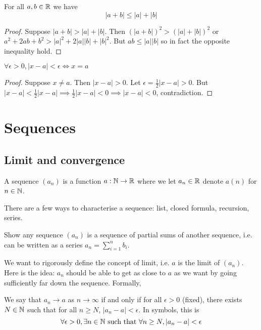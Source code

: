 \documentclass[11pt]{article}
\begin{document}
\begin{theorem}
  For all \(a,b \in\mathbb{R}\) we have \[|a+b|\leq |a|+|b|\]
\end{theorem}
\begin{proof}
  Suppose \(|a+b|>|a|+|b|\). Then \((|a+b|)^2>(|a|+|b|)^2\) or \(a^2+2ab+b^2>|a|^2+2|a||b|+|b|^2\). But \(ab\leq |a||b|\) so in fact the opposite inequality hold. 
\end{proof}

\begin{proposition}
  \(\forall \epsilon >0, |x-a|<\epsilon \iff x=a\)
\end{proposition}
\begin{proof}
  Suppose \(x\neq a\). Then \(|x-a|>0\). Let \(\epsilon=\frac{1}{2}|x-a|>0\). But \(|x-a|<\frac{1}{2}|x-a| \implies \frac{1}{2}|x-a|<0 \implies |x-a|<0\), contradiction.
\end{proof}

\section{Sequences}
\subsection{Limit and convergence}
\begin{definition}[Sequence]
  A sequence \((a_n)\) is a function \(a:\mathbb{N} \to \mathbb{R}\) where we let \(a_n\in\mathbb{R}\) denote \(a(n)\) for \(n\in\mathbb{N}\).
\end{definition}


There are a few ways to characterise a sequence: list, closed formula, recursion, series.

\begin{exercise}
  Show any sequence \((a_n)\) is a sequence of partial sums of another sequence, i.e. can be written as a series \(a_n=\sum_{i=1}^nb_i\).
\end{exercise}

We want to rigorously define the concept of limit, i.e. \(a\) is the limit of \((a_n)\). Here is the idea: \(a_n\) should be able to get as close to \(a\) as we want by going sufficiently far down the sequence. Formally,
\begin{definition}
  We say that \(a_n\to a\) as \(n\to\infty\) if and only if for all \(\epsilon >0\) (fixed), there exists \(N\in\mathbb{N}\) such that for all \(n\geq N\), \(|a_n-a|<\epsilon\). In symbols, this is
  \[\forall \epsilon >0, \exists n\in\mathbb{N} \text{ such that } \forall n\geq N, |a_n-a|<\epsilon\]
\end{definition}
\end{document}
